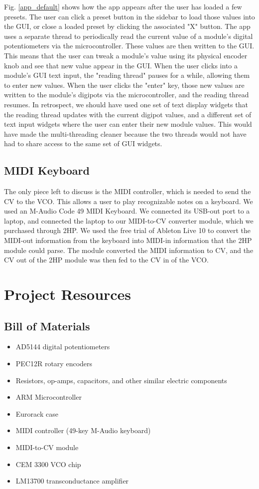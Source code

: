 \documentclass[letterpaper, 12 pt, conference]{ieeeconf}
\begin{document}
Fig. \ref{app_default} shows how the app appears after the user has loaded a few presets. The user can click a preset button in the sidebar to load those values into the GUI, or close a loaded preset by clicking the associated "X" button. The app uses a separate thread to periodically read the current value of a module's digital potentiometers via the microcontroller. These values are then written to the GUI. This means that the user can tweak a module's value using its physical encoder knob and see that new value appear in the GUI. When the user clicks into a module's GUI text input, the "reading thread" pauses for a while, allowing them to enter new values. When the user clicks the "enter" key, those new values are written to the module's digipots via the microcontroller, and the reading thread resumes. In retrospect, we should have used one set of text display widgets that the reading thread updates with the current digipot values, and a different set of text input widgets where the user can enter their new module values. This would have made the multi-threading cleaner because the two threads would not have had to share access to the same set of GUI widgets.

\subsection{MIDI Keyboard}

The only piece left to discuss is the MIDI controller, which is needed to send the CV to the VCO. This allows a user to play recognizable notes on a keyboard. We used an M-Audio Code 49 MIDI Keyboard. We connected its USB-out port to a laptop, and connected the laptop to our MIDI-to-CV converter module, which we purchased through 2HP. We used the free trial of Ableton Live 10 to convert the MIDI-out information from the keyboard into MIDI-in information that the 2HP module could parse. The module converted the MIDI information to CV, and the CV out of the 2HP module was then fed to the CV in of the VCO.


\section{Project Resources}

\subsection{Bill of Materials}
\begin{itemize}
  \item AD5144 digital potentiometers
  \item PEC12R rotary encoders
  \item Resistors, op-amps, capacitors, and other similar electric components
  \item ARM Microcontroller
  \item Eurorack case
  \item MIDI controller (49-key M-Audio keyboard)
  \item MIDI-to-CV module
  \item CEM 3300 VCO chip
  \item LM13700 transconductance amplifier
\end{itemize}
\end{document}
